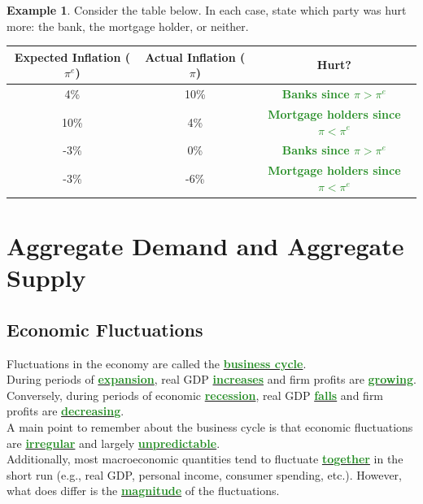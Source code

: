 \documentclass[11pt]{article}\usepackage[]{graphicx}\usepackage[]{color}
\theoremstyle{definition}
\newtheorem{exmp}{Example}[section]
\newcommand{\ddp}[1]{{\textbf{\textcolor{ForestGreen}{#1}}}}
\newcommand{\dd}[1]{{\underline{\textbf{\textcolor{ForestGreen}{#1}}}}}
\begin{document}
\begin{exmp}

Consider the table below. In each case, state which party was hurt more: the bank, the mortgage holder, or neither. 

\begin{table}[ht]
	\centering
	\begin{tabular}{ c|c |c}        
		
		Expected Inflation ($\pi^e$) & Actual Inflation ($\pi$) & Hurt?\\
		\hline
		4\% & 10\% & \ddp{Banks since $\pi > \pi^e$} \\
		10\% & 4\% & \ddp{Mortgage holders since $\pi < \pi^e$} \\
		-3\% & 0\% & \ddp{Banks since $\pi > \pi^e$} \\
		-3\% & -6\%  & \ddp{Mortgage holders since $\pi < \pi^e$}\\
	\end{tabular}
\end{table} 
\end{exmp}

\newpage

\section{Aggregate Demand and Aggregate Supply}

\subsection{Economic Fluctuations}

Fluctuations in the economy are called the \dd{business cycle}. 
\\

During periods of \dd{expansion}, real GDP \dd{increases} and firm profits are \dd{growing}.
\\

Conversely, during periods of economic \dd{recession}, real GDP \dd{falls} and firm profits are \dd{decreasing}.
\\

A main point to remember about the business cycle is that economic fluctuations are \dd{irregular} and largely \dd{unpredictable}.
\\

Additionally, most macroeconomic quantities tend to fluctuate \dd{together} in the short run (e.g., real GDP, personal income, consumer spending, etc.). However, what does differ is the \dd{magnitude} of the fluctuations.
\\
\end{document}

